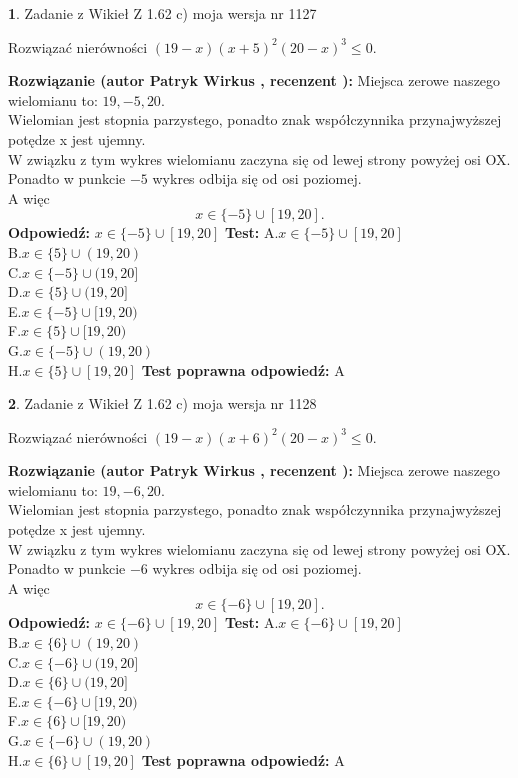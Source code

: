 \documentclass[12pt, a4paper]{article}
\theoremstyle{definition} %
\newtheorem{zad}{}
\newcommand{\zadStart}[1]{\begin{zad}#1\newline}
\newcommand{\zadStop}{\end{zad}}
\newcommand{\rozwStart}[2]{\noindent \textbf{Rozwiązanie (autor #1 , recenzent #2): }\newline}
\newcommand{\rozwStop}{\newline}
\newcommand{\odpStart}{\noindent \textbf{Odpowiedź:}\newline}
\newcommand{\odpStop}{\newline}
\newcommand{\testStart}{\noindent \textbf{Test:}\newline}
\newcommand{\testStop}{\newline}
\newcommand{\kluczStart}{\noindent \textbf{Test poprawna odpowiedź:}\newline}
\newcommand{\kluczStop}{\newline}
\begin{document}
\zadStart{Zadanie z Wikieł Z 1.62 c) moja wersja nr 1127}

Rozwiązać nierówności $(19-x)(x+5)^{2}(20-x)^{3}\le0$.
\zadStop
\rozwStart{Patryk Wirkus}{}
Miejsca zerowe naszego wielomianu to: $19, -5, 20$.\\
Wielomian jest stopnia parzystego, ponadto znak współczynnika przy\linebreak najwyższej potędze x jest ujemny.\\ W związku z tym wykres wielomianu zaczyna się od lewej strony powyżej osi OX.\\
Ponadto w punkcie $-5$ wykres odbija się od osi poziomej.\\
A więc $$x \in \{-5\} \cup [19,20].$$
\rozwStop
\odpStart
$x \in \{-5\} \cup [19,20]$
\odpStop
\testStart
A.$x \in \{-5\} \cup [19,20]$\\
B.$x \in \{5\} \cup (19,20)$\\
C.$x \in \{-5\} \cup (19,20]$\\
D.$x \in \{5\} \cup (19,20]$\\
E.$x \in \{-5\} \cup [19,20)$\\
F.$x \in \{5\} \cup [19,20)$\\
G.$x \in \{-5\} \cup (19,20)$\\
H.$x \in \{5\} \cup [19,20]$
\testStop
\kluczStart
A
\kluczStop



\zadStart{Zadanie z Wikieł Z 1.62 c) moja wersja nr 1128}

Rozwiązać nierówności $(19-x)(x+6)^{2}(20-x)^{3}\le0$.
\zadStop
\rozwStart{Patryk Wirkus}{}
Miejsca zerowe naszego wielomianu to: $19, -6, 20$.\\
Wielomian jest stopnia parzystego, ponadto znak współczynnika przy\linebreak najwyższej potędze x jest ujemny.\\ W związku z tym wykres wielomianu zaczyna się od lewej strony powyżej osi OX.\\
Ponadto w punkcie $-6$ wykres odbija się od osi poziomej.\\
A więc $$x \in \{-6\} \cup [19,20].$$
\rozwStop
\odpStart
$x \in \{-6\} \cup [19,20]$
\odpStop
\testStart
A.$x \in \{-6\} \cup [19,20]$\\
B.$x \in \{6\} \cup (19,20)$\\
C.$x \in \{-6\} \cup (19,20]$\\
D.$x \in \{6\} \cup (19,20]$\\
E.$x \in \{-6\} \cup [19,20)$\\
F.$x \in \{6\} \cup [19,20)$\\
G.$x \in \{-6\} \cup (19,20)$\\
H.$x \in \{6\} \cup [19,20]$
\testStop
\kluczStart
A
\kluczStop
\end{document}

